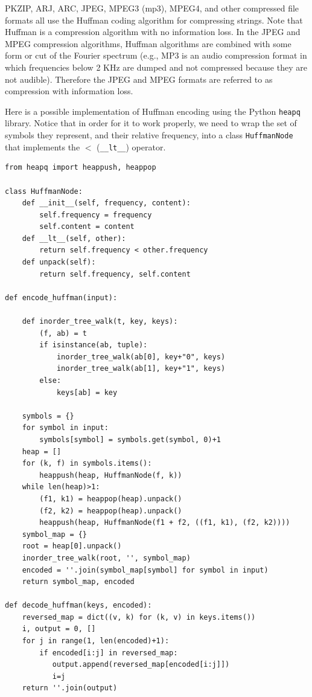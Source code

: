 \documentclass[justified, sixbynine]{tufte-book}
\def\ft{\small\tt}
\theoremstyle{plain}%
\newtheorem * {corollary}{Corollary}
\theoremstyle{definition}
\theoremstyle{remark}
\newtheorem * {remark}{Remark}
\newtheorem * {note}{Note}
\begin{document}
\begin{fullwidth}
PKZIP, ARJ, ARC, JPEG, MPEG3 (mp3), MPEG4, and other
compressed file formats all use the Huffman coding algorithm for compressing
strings. Note that Huffman is a compression algorithm with
no information loss. In the JPEG and MPEG compression algorithms, Huffman algorithms are
combined with some form or cut of the Fourier spectrum (e.g., MP3 is
an audio compression format in which frequencies below 2 KHz are dumped and not
compressed because they are not audible). Therefore the JPEG and MPEG
formats are referred to as compression with information loss.

Here is a possible implementation of Huffman encoding using the Python {\ft heapq} library. Notice that in order for it to work properly, we need to wrap the set of symbols they represent, and their relative frequency, into a class {\ft HuffmanNode} that implements the $<$ ({\ft \_\_lt\_\_}) operator.

\begin{lstlisting}[caption={in file: {\ft nlib.py}}]
from heapq import heappush, heappop

class HuffmanNode:
    def __init__(self, frequency, content):
        self.frequency = frequency
        self.content = content
    def __lt__(self, other):
        return self.frequency < other.frequency
    def unpack(self):
        return self.frequency, self.content
  
def encode_huffman(input):

    def inorder_tree_walk(t, key, keys):
        (f, ab) = t
        if isinstance(ab, tuple):
            inorder_tree_walk(ab[0], key+"0", keys)
            inorder_tree_walk(ab[1], key+"1", keys)
        else:
            keys[ab] = key

    symbols = {}
    for symbol in input:
        symbols[symbol] = symbols.get(symbol, 0)+1
    heap = []
    for (k, f) in symbols.items():
        heappush(heap, HuffmanNode(f, k))
    while len(heap)>1:
        (f1, k1) = heappop(heap).unpack()
        (f2, k2) = heappop(heap).unpack()
        heappush(heap, HuffmanNode(f1 + f2, ((f1, k1), (f2, k2))))
    symbol_map = {}
    root = heap[0].unpack()    
    inorder_tree_walk(root, '', symbol_map)
    encoded = ''.join(symbol_map[symbol] for symbol in input)
    return symbol_map, encoded

def decode_huffman(keys, encoded):
    reversed_map = dict((v, k) for (k, v) in keys.items())
    i, output = 0, []
    for j in range(1, len(encoded)+1):
        if encoded[i:j] in reversed_map:
           output.append(reversed_map[encoded[i:j]])
           i=j
    return ''.join(output)
\end{lstlisting}


\end{fullwidth}
\end{document}
